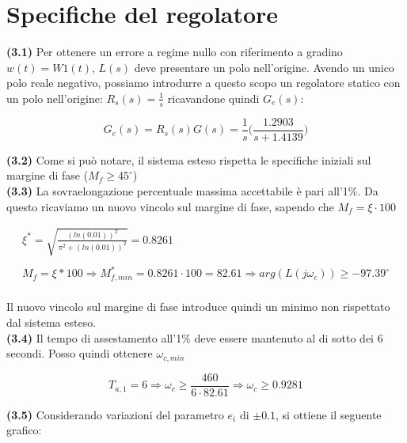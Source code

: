 \documentclass[a4paper,12pt,italian]{article}
\begin{document}
\newpage

\section{Specifiche del regolatore}

\textbf{(3.1)} Per ottenere un errore a regime nullo con riferimento a gradino $w(t) = W1(t)$, $L(s)$ deve presentare un polo nell'origine.
Avendo un unico polo reale negativo, possiamo introdurre a questo scopo un regolatore statico con un polo nell'origine: $ R_s(s) = \frac{1}{s} $ ricavandone quindi $ G_e(s) $:

\begin{equation*}
    G_e(s) = R_s(s)G(s) = \frac{1}{s}\Big(\frac{1.2903}{s + 1.4139}\Big)
\end{equation*}

\textbf{(3.2)} Come si può notare, il sistema esteso rispetta le specifiche iniziali sul margine di fase ($ M_f \geq 45^\circ$)\\

\textbf{(3.3)} La sovraelongazione percentuale massima accettabile è pari all'1\%. 
Da questo ricaviamo un nuovo vincolo sul margine di fase, sapendo che $M_f = \xi \cdot 100 $

\begin{equation*}
    \begin{array}{c}
        \xi^* = \sqrt{\frac{(ln(0.01))^2}{\pi^2+(ln(0.01))^2}} = 0.8261\\ \\
        M_f=\xi * 100 \Longrightarrow M^*_{f,min}=0.8261 \cdot 100 = 82.61
        \Longrightarrow arg(L(j\omega_c)) \geq -97.39^\circ
    \end{array}
\end{equation*}\\
Il nuovo vincolo sul margine di fase introduce quindi un minimo non rispettato dal sistema esteso.\\

\textbf{(3.4)} Il tempo di assestamento all'1\% deve essere mantenuto al di sotto dei 6 secondi.
Posso quindi ottenere $ \omega_{c,min} $

\begin{equation*}
    T_{a,1} = 6 
    \Longrightarrow 
    \omega_c \ge \frac{460}{6 \cdot 82.61}
    \Longrightarrow
    \omega_c \ge 0.9281
\end{equation*}


\textbf{(3.5)} Considerando variazioni del parametro $e_i$ di $\pm 0.1$, si ottiene il seguente grafico:
\end{document}
